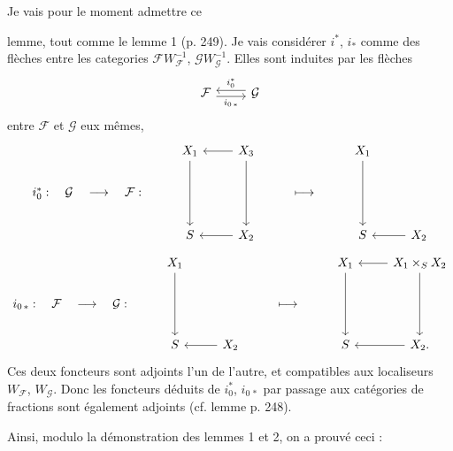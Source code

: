 \documentclass[11pt]{article}
\newcommand{\printedpage}[1]{\marginpar{\footnotesize p.~#1}}
\newcommand{\msp}[1]{\marginpar{\footnotesize [#1]}}
\begin{document}
Je vais pour le moment admettre ce

\msp{page 252}

lemme, tout comme le lemme 1 (p. 249). Je vais considérer $i^*$, $i_*$ comme des flèches entre les categories $\mathcal{F}W_{\mathcal{F}}^{-1}$, $\mathcal{G}W_{\mathcal{G}}^{-1}$. Elles sont induites par les flèches %
\[
\begin{tikzcd}
\mathcal{F} \arrow[r, shift right, "i_{0\,*}"'] & \mathcal{G} \arrow[l, shift right, "i_0^*"']
\end{tikzcd}
\]
entre $\mathcal{F}$ et $\mathcal{G}$ eux mêmes, %
\[
\begin{tikzcd}
 & X_1 \arrow[dd] & X_3 \arrow[l] \arrow[dd] & & X_1 \arrow[dd] & \\
i_0^* :\quad \mathcal{G}\quad\longrightarrow\quad\mathcal{F} : & & & \longmapsto & & \\
 & S & X_2 \arrow[l] & & S & X_2 \arrow[l]
\end{tikzcd}
\]
\[
\begin{tikzcd}
 & X_1 \arrow[dd] & & & X_1 \arrow[dd] & X_1\times_S X_2 \arrow[l] \arrow[dd] \\
i_{0\,*} :\quad \mathcal{F}\quad\longrightarrow\quad\mathcal{G} : & & & \longmapsto & & \\
 & S & X_2 \arrow[l] & & S & X_2. \arrow[l]
\end{tikzcd}
\]
Ces deux foncteurs sont adjoints l'un de l'autre, et compatibles aux localiseurs $W_{\mathcal{F}}$, $W_{\mathcal{G}}$. Donc les foncteurs déduits de $i_0^*$, $i_{0\,*}$ par passage aux catégories de fractions sont également adjoints (cf. lemme p. 248).

Ainsi, modulo la démonstration des lemmes 1 et 2, on a prouvé ceci :

\printedpage{164}

\msp{page 253}
\end{document}
